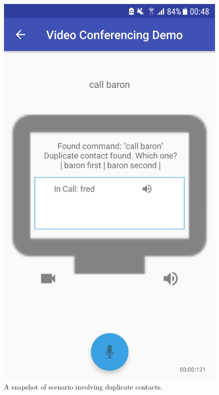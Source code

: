 \documentclass[11pt]{article}
\begin{document}
\begin{appendices}
\begin{center}
\begin{figure}[H]
\begin{center}
  \includegraphics[scale=0.25]{duplicate-contacts.png}
  \caption{A snapshot of scenario involving duplicate contacts.}
  \label{fig:snapshot-duplicate-contacts}
  \end{center}
\end{figure}
\end{center}


\end{appendices}
\end{document}
